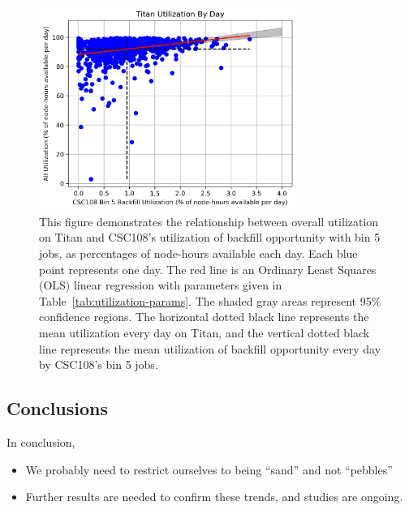 \begin{figure}
  \includegraphics[width=0.75\textwidth]{images/linfit-utilization-by-true-day-bin5.png}
\caption{This figure demonstrates the relationship between overall utilization
on Titan and CSC108's utilization of backfill opportunity with bin 5 jobs, as
percentages of node-hours available each day. Each blue point represents one
day. The red line is an Ordinary Least Squares (OLS) linear regression with
parameters given in Table~\ref{tab:utilization-params}. The shaded gray areas
represent 95\% confidence regions. The horizontal dotted black line represents
the mean utilization every day on Titan, and the vertical dotted black line
represents the mean utilization of backfill opportunity every day by CSC108's
bin 5 jobs.}
\label{fig:utilization-bin5}
\end{figure}


\subsection{Conclusions}
\label{subsec:sec4-conclusions}

In conclusion,
\begin{itemize}
    \item We probably need to restrict ourselves to being ``sand'' and not
        ``pebbles''
    \item Further results are needed to confirm these trends, and studies are
        ongoing.
\end{itemize}





